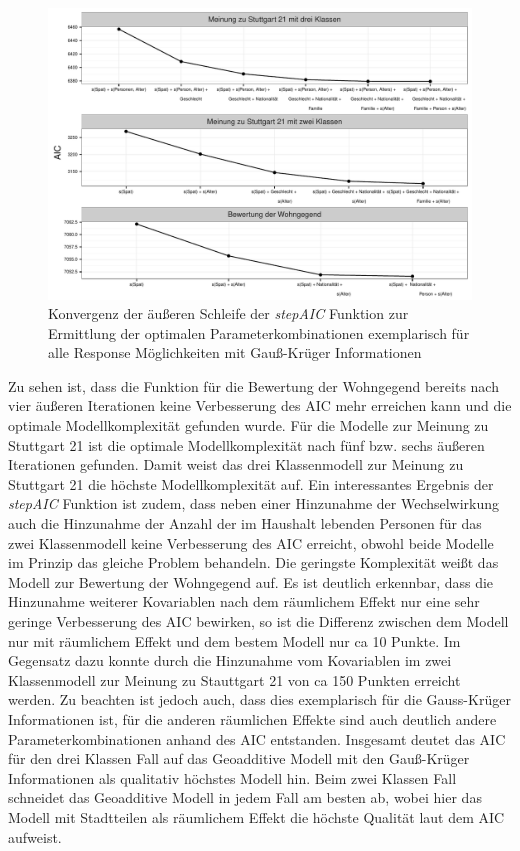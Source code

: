 \documentclass{Vorlage}
\begin{document}
\begin{figure}[h]
 \begin{center}
 \includegraphics[scale=0.8]{Pictures/stepAIC}
 \caption{Konvergenz der äußeren Schleife der \textit{stepAIC} Funktion zur Ermittlung der optimalen Parameterkombinationen exemplarisch für alle Response Möglichkeiten mit Gauß-Krüger Informationen}
 \label{AIC}
 \end{center}
\end{figure}

Zu sehen ist, dass die Funktion für die Bewertung der Wohngegend bereits nach vier äußeren Iterationen keine Verbesserung des AIC mehr erreichen kann und die optimale Modellkomplexität gefunden wurde. Für die Modelle zur Meinung zu Stuttgart 21 ist die optimale Modellkomplexität nach fünf bzw. sechs äußeren Iterationen gefunden. Damit weist das drei Klassenmodell zur Meinung zu Stuttgart 21 die höchste Modellkomplexität auf. Ein interessantes Ergebnis der \textit{stepAIC} Funktion ist zudem, dass neben einer Hinzunahme der Wechselwirkung auch die Hinzunahme der Anzahl der im Haushalt lebenden Personen für das zwei Klassenmodell keine Verbesserung des AIC erreicht, obwohl beide Modelle im Prinzip das gleiche Problem behandeln. Die geringste Komplexität weißt das Modell zur Bewertung der Wohngegend auf. Es ist deutlich erkennbar, dass die Hinzunahme weiterer Kovariablen nach dem räumlichem Effekt nur eine sehr geringe Verbesserung des AIC bewirken, so ist die Differenz zwischen dem Modell nur mit räumlichem Effekt und dem bestem Modell nur ca 10 Punkte. Im Gegensatz dazu konnte durch die Hinzunahme vom Kovariablen im zwei Klassenmodell zur Meinung zu Stauttgart 21 von ca 150 Punkten erreicht werden. Zu beachten ist jedoch auch, dass dies exemplarisch für die Gauss-Krüger Informationen ist, für die anderen räumlichen Effekte sind auch deutlich andere Parameterkombinationen anhand des AIC entstanden.
Insgesamt deutet das AIC für den drei Klassen Fall auf das Geoadditive Modell mit den Gauß-Krüger Informationen als qualitativ höchstes Modell hin. Beim zwei Klassen Fall schneidet das Geoadditive Modell in jedem Fall am besten ab, wobei hier das Modell mit Stadtteilen als räumlichem Effekt die höchste Qualität laut dem AIC aufweist.
\end{document}

